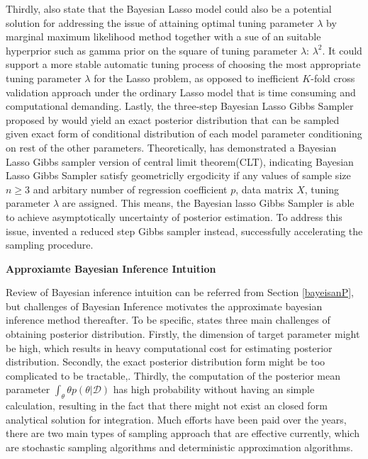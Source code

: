Thirdly, \cite{park_casella_2008} also state that the Bayesian Lasso model could also be a potential solution for addressing the issue of attaining optimal tuning parameter $\lambda$ by marginal maximum likelihood method together with a sue of an suitable hyperprior such as gamma prior on the square of tuning parameter $\lambda$: $\lambda^2$. 
It could support a more stable automatic tuning process of choosing the most appropriate tuning parameter $\lambda$ for the Lasso problem, as opposed to inefficient $K$-fold cross validation approach under the ordinary Lasso model that is time consuming and computational demanding. Lastly, the three-step Bayesian Lasso Gibbs Sampler proposed by \cite{park_casella_2008} would yield an exact posterior distribution that can be sampled given exact form of conditional distribution of each model parameter conditioning on rest of the other parameters. Theoretically, \cite{khare_hobert_2013} has demonstrated a Bayesian Lasso Gibbs sampler version of central limit theorem(CLT), indicating Bayesian Lasso Gibbs Sampler satisfy geometriclly ergodicity if any values of sample size $n \geq 3$ and arbitary number of regression coefficient $p$, data matrix $X$, tuning parameter $\lambda$ are assigned. This means, the Bayesian lasso Gibbs Sampler is able to achieve asymptotically uncertainty of posterior estimation. To address this issue, \cite{FastBL} invented a reduced step Gibbs sampler instead, successfully accelerating the sampling procedure. 


\textbf{Approxiamte Bayesian Inference Intuition}

Review of Bayesian inference intuition can be referred from Section \ref{bayeisanP}, but challenges of Bayesian Inference motivates the approximate bayesian inference method thereafter. To be specific, \cite{bishop_2006} states three main challenges of obtaining posterior distribution. Firstly, the dimension of target parameter might be high, which results in heavy computational cost for estimating posterior distribution. Secondly, the exact posterior distribution form might be too complicated to be tractable,. Thirdly, the computation of the posterior mean parameter $\int_{\theta} \theta p(\theta|\mathcal{D})$ has high probability without having an simple calculation, resulting in the fact that there might not exist an closed form analytical solution for integration. Much efforts have been paid over the years, there are two main types of sampling approach that are effective currently, which are stochastic sampling algorithms and deterministic approximation algorithms. 

